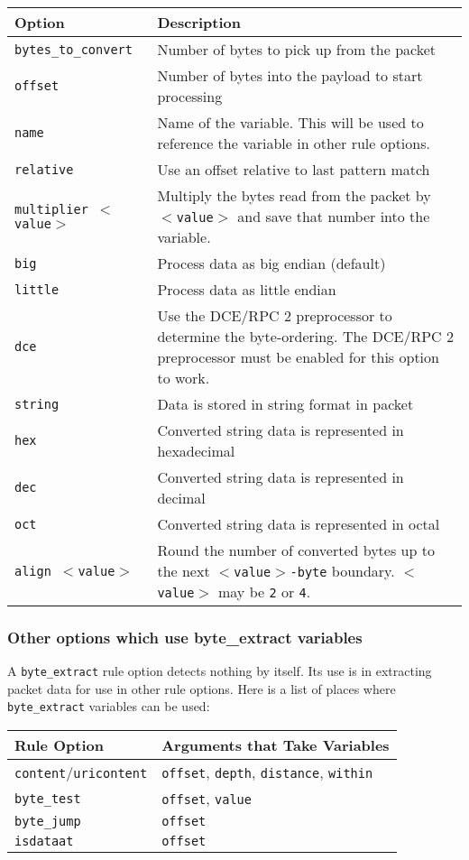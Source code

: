 \documentclass[english]{report}
\begin{document}
\begin{tabular}{| l | p{4.5in} |}
\hline
{\bf Option} & {\bf Description}\\
\hline
\hline
\texttt{bytes\_to\_convert} & Number of bytes to pick up from the packet\\
\hline
\texttt{offset} & Number of bytes into the payload to start processing\\
\hline
\texttt{name} & Name of the variable. This will be used to reference the
variable in other rule options.\\
\hline
\texttt{relative} & Use an offset relative to last pattern match\\
\hline
\texttt{multiplier $<$value$>$} & Multiply the bytes read from the packet by
\texttt{$<$value$>$} and save that number into the variable.\\
\hline
\texttt{big} & Process data as big endian (default)\\
\hline
\texttt{little} & Process data as little endian\\
\hline
\texttt{dce} & Use the DCE/RPC 2 preprocessor to determine the byte-ordering.
The DCE/RPC 2 preprocessor must be enabled for this option to work.\\
\hline
\texttt{string} & Data is stored in string format in packet\\
\hline
\texttt{hex} & Converted string data is represented in hexadecimal\\
\hline
\texttt{dec} & Converted string data is represented in decimal\\
\hline
\texttt{oct} & Converted string data is represented in octal\\
\hline
\texttt{align $<$value$>$} & Round the number of converted bytes up to the next
\texttt{$<$value$>$-byte} boundary. \texttt{$<$value$>$} may be \texttt{2} or
\texttt{4}.\\
\hline
\end{tabular}

\subsubsection{Other options which use byte\_extract variables}

A \texttt{byte\_extract} rule option detects nothing by itself. Its use is in
extracting packet data for use in other rule options. Here is a list of places
where \texttt{byte\_extract} variables can be used:

\begin{tabular}{| l | p{4.5in} |}
\hline
{\bf Rule Option} & {\bf Arguments that Take Variables}\\
\hline
\hline
\texttt{content}/\texttt{uricontent} & \texttt{offset}, \texttt{depth},
\texttt{distance}, \texttt{within}\\
\hline
\texttt{byte\_test} & \texttt{offset}, \texttt{value}\\
\hline
\texttt{byte\_jump} & \texttt{offset}\\
\hline
\texttt{isdataat} & \texttt{offset}\\
\hline
\end{tabular}
\end{document}
